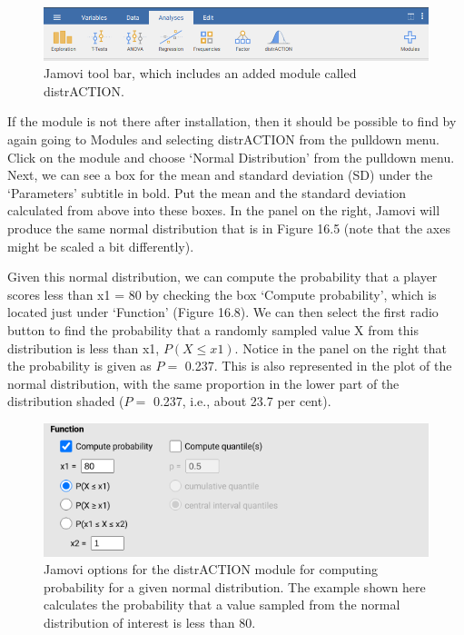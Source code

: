 \documentclass[
]{scrbook}
\begin{document}
\begin{figure}
\includegraphics[width=1\linewidth]{img/jamovi_toolbar_modules_distrACTION} \caption{Jamovi tool bar, which includes an added module called distrACTION.}\label{fig:unnamed-chunk-72}
\end{figure}

If the module is not there after installation, then it should be possible to find by again going to Modules and selecting distrACTION from the pulldown menu.
Click on the module and choose `Normal Distribution' from the pulldown menu.
Next, we can see a box for the mean and standard deviation (SD) under the `Parameters' subtitle in bold.
Put the mean and the standard deviation calculated from above into these boxes.
In the panel on the right, Jamovi will produce the same normal distribution that is in Figure 16.5 (note that the axes might be scaled a bit differently).

Given this normal distribution, we can compute the probability that a player scores less than x1 = 80 by checking the box `Compute probability', which is located just under `Function' (Figure 16.8).
We can then select the first radio button to find the probability that a randomly sampled value X from this distribution is less than x1, \(P(X \leq x1)\).
Notice in the panel on the right that the probability is given as \(P =\) 0.237.
This is also represented in the plot of the normal distribution, with the same proportion in the lower part of the distribution shaded (\(P =\) 0.237, i.e., about 23.7 per cent).

\begin{figure}
\includegraphics[width=0.8\linewidth]{img/jamovi_normal_distribution} \caption{Jamovi options for the distrACTION module for computing probability for a given normal distribution. The example shown here calculates the probability that a value sampled from the normal distribution of interest is less than 80.}\label{fig:unnamed-chunk-73}
\end{figure}
\end{document}
